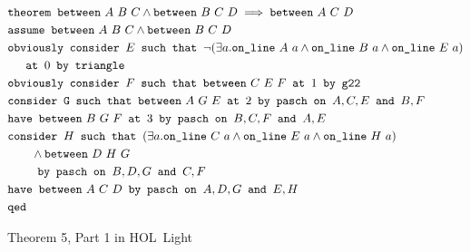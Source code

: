 \begin{figure}
\begin{align*}
&\texttt{theorem }\texttt{between}\ A\ B\ C \wedge \texttt{between}\ B\ C\ D \implies \texttt{between}\ A\ C\ D\\
&\texttt{assume }\texttt{between}\ A\ B\ C \wedge \texttt{between}\ B\ C\ D\\
&\texttt{obviously consider } E \texttt{ such that } \neg(\exists a.\texttt{on\_line}\ A\ a\wedge \texttt{on\_line}\ B\ a\wedge \texttt{on\_line}\ E\ a)\\
&\quad\texttt{ at } 0 \texttt{ by triangle}\\
&\texttt{obviously consider } F \texttt{ such that } \texttt{between}\ C\ E\ F \texttt{ at } 1 \texttt { by g22}\\
&\texttt{consider G such that } \texttt{between}\ A\ G\ E \texttt{ at } 2 \texttt{ by pasch on } A,C,E \texttt{ and } B,F\\
&\texttt{have } \texttt{between}\ B\ G\ F \texttt{ at } 3 \texttt{ by pasch on } B,C,F \texttt{ and } A,E\\
&\texttt{consider } H \texttt{ such that } (\exists a. \texttt{on\_line}\ C\ a\wedge \texttt{on\_line}\ E\ a \wedge \texttt{on\_line}\ H\ a)\\
&\qquad\wedge \texttt{between}\ D\ H\ G\\
&\qquad\texttt{ by pasch on } B,D,G \texttt{ and } C,F\\
&\texttt{have } \texttt{between}\ A\ C\ D \texttt{ by pasch on } A,D,G \texttt{ and } E,H\\
&\texttt{qed}
\end{align*}
\caption{Theorem 5, Part 1 in HOL~Light}
\label{fig:Theorem51Formalised}
\end{figure}

